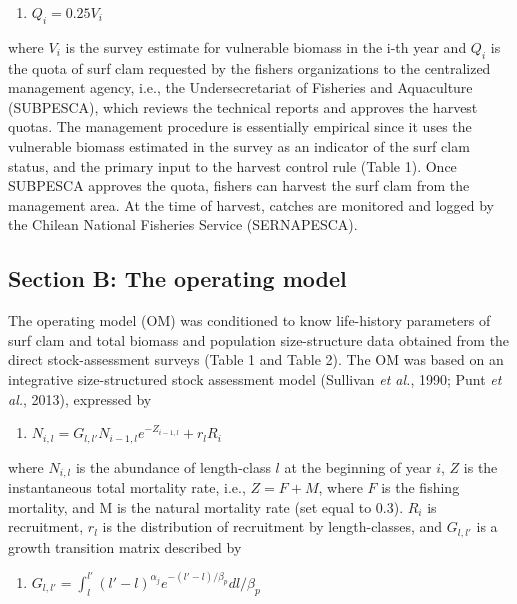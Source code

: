 \documentclass[12pt]{article}
\providecommand{\tightlist}{%
  \setlength{\itemsep}{0pt}\setlength{\parskip}{0pt}}
\begin{document}
\begin{enumerate}
\def\labelenumi{\arabic{enumi})}
\tightlist
\item
  \(Q_i=0.25 V_i\)
\end{enumerate}

where \(V_i\) is the survey estimate for vulnerable biomass in the i-th
year and \(Q_i\) is the quota of surf clam requested by the fishers
organizations to the centralized management agency, i.e., the
Undersecretariat of Fisheries and Aquaculture (SUBPESCA), which reviews
the technical reports and approves the harvest quotas. The management
procedure is essentially empirical since it uses the vulnerable biomass
estimated in the survey as an indicator of the surf clam status, and the
primary input to the harvest control rule (Table 1). Once SUBPESCA
approves the quota, fishers can harvest the surf clam from the
management area. At the time of harvest, catches are monitored and
logged by the Chilean National Fisheries Service (SERNAPESCA).

\hypertarget{section-b-the-operating-model}{%
\subsection{Section B: The operating
model}\label{section-b-the-operating-model}}

The operating model (OM) was conditioned to know life-history parameters
of surf clam and total biomass and population size-structure data
obtained from the direct stock-assessment surveys (Table 1 and Table 2).
The OM was based on an integrative size-structured stock assessment
model (Sullivan \emph{et al.}, 1990; Punt \emph{et al.}, 2013),
expressed by

\begin{enumerate}
\def\labelenumi{\arabic{enumi})}
\setcounter{enumi}{1}
\tightlist
\item
  \(N_{i,l}=G_{l,l'} N_{i-1,l} e^{-Z_{i-1,l} }+ r_l R_i\)
\end{enumerate}

where \(N_{i,l}\) is the abundance of length-class \(l\) at the
beginning of year \(i\), \(Z\) is the instantaneous total mortality
rate, i.e., \(Z=F+M\), where \(F\) is the fishing mortality, and M is
the natural mortality rate (set equal to 0.3). \(R_i\) is recruitment,
\(r_l\) is the distribution of recruitment by length-classes, and
\(G_{l,l'}\) is a growth transition matrix described by

\begin{enumerate}
\def\labelenumi{\arabic{enumi})}
\setcounter{enumi}{2}
\tightlist
\item
  \(G_{l,l'}=\int_l^{l'} (l'-l)^{\alpha_j} e^{-(l'-l)/\beta_p } dl/\beta_p\)
\end{enumerate}
\end{document}
